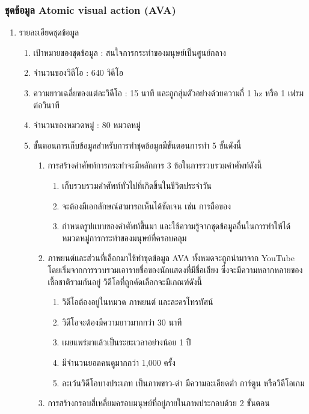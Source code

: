 \subsubsection*{ชุดข้อมูล Atomic visual action (AVA)}	
\begin{enumerate}
	\item {รายละเอียดชุดข้อมูล}
	\begin{enumerate}
		\item เป้าหมายของชุดข้อมูล : สนใจการกระทำของมนุษย์เป็นศูนย์กลาง
		\item จำนวนของวิดีโอ : 640 วิดีโอ
		\item ความยาวเฉลี่ยของแต่ละวิดีโอ : 15 นาที และถูกสุ่มตัวอย่างด้วยความถี่ 1 hz หรือ 1 เฟรมต่อวินาที
		\item จำนวนของหมวดหมู่ : 80 หมวดหมู่
		\item ขั้นตอนการเก็บข้อมูลสำหรับการทำชุดข้อมูลมีขั้นตอนการทำ 5 ขั้นดังนี้
		\begin{enumerate}
			\item การสร้างคำศัพท์การกระทำจะมีหลักการ 3 ข้อในการรวบรวมคำศัพท์ดังนี้
			\begin{enumerate}
				\item เก็บรวบรวมคำศัพท์ทั่วไปที่เกิดขึ้นในชีวิตประจำวัน
				\item จะต้องมีเอกลักษณ์สามารถเห็นได้ชัดเจน เช่น การถือของ
				\item กำหนดรูปแบบของคำศัพท์ขึ้นมา และใช้ความรู้จากชุดข้อมูลอื่นในการทำให้ได้หมวดหมู่การกระทำของมนุษย์ที่ครอบคลุม
			\end{enumerate}
			\item ภาพยนต์และส่วนที่เลือกมาใช้ทำชุดข้อมูล AVA ทั้งหมดจะถูกนำมาจาก YouTube โดยเริ่มจากการรวบรวมเอารายชื่อของนักแสดงที่มีชื่อเสียง
			ซึ่งจะมีความหลากหลายของเชื้อชาติรวมกันอยู่ วิดีโอที่ถูกคัดเลือกจะมีเกณฑ์ดังนี้
			\begin{enumerate}
				\item วิดีโอต้องอยู่ในหมวด ภาพยนต์ และละครโทรทัศน์
				\item วิดีโอจะต้องมีความยาวมากกว่า 30 นาที
				\item เผยแพร่มาแล้วเป็นระยะเวลาอย่างน้อย 1 ปี
				\item มีจำนวนยอดคนดูมากกว่า 1,000 ครั้ง
				\item ละเว้นวิดีโอบางประเภท เป็นภาพขาว-ดำ มีความละเอียดต่ำ การ์ตูน หรือวิดีโอเกม
			\end{enumerate}
			\item การสร้างกรอบสี่เหลี่ยมครอบมนุษย์ที่อยู่ภายในภาพประกอบด้วย 2 ขั้นตอน
			\begin{enumerate}

\end{enumerate}
\end{enumerate}
\end{enumerate}
\end{enumerate}
